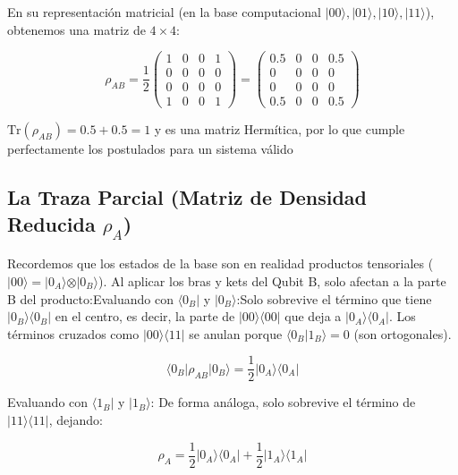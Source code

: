 \documentclass[11pt]{article}
\begin{document}
En su representación matricial (en la base computacional
\(\vert{}00\rangle, \vert{}01\rangle, \vert{}10\rangle, \vert{}11\rangle\)),
obtenemos una matriz de \(4 \times 4\):

\[\rho_{AB} = \frac{1}{2} \begin{pmatrix} 1 & 0 & 0 & 1 \\ 0 & 0 & 0 & 0 \\ 0 & 0 & 0 & 0 \\ 1 & 0 & 0 & 1 \end{pmatrix} = \begin{pmatrix} 0.5 & 0 & 0 & 0.5 \\ 0 & 0 & 0 & 0 \\ 0 & 0 & 0 & 0 \\ 0.5 & 0 & 0 & 0.5 \end{pmatrix}\]

\(\text{Tr}(\rho_{AB}) = 0.5 + 0.5 = 1\) y es una matriz Hermítica, por
lo que cumple perfectamente los postulados para un sistema válido

\subsection{\texorpdfstring{La Traza Parcial (Matriz de Densidad
Reducida
\(\rho_A\))}{La Traza Parcial (Matriz de Densidad Reducida \textbackslash rho\_A)}}\label{la-traza-parcial-matriz-de-densidad-reducida-rho_a}

Recordemos que los estados de la base son en realidad productos
tensoriales
(\(\vert{}00\rangle = \vert{}0_A\rangle \otimes \vert{}0_B\rangle\)). Al
aplicar los bras y kets del Qubit B, solo afectan a la parte B del
producto:Evaluando con \(\langle 0_B\vert{}\) y
\(\vert{} 0_B \rangle\):Solo sobrevive el término que tiene
\(\vert{}0_B\rangle\langle 0_B\vert{}\) en el centro, es decir, la parte
de \(\vert{}00\rangle\langle 00\vert{}\) que deja a
\(\vert{}0_A\rangle\langle 0_A\vert{}\). Los términos cruzados como
\(\vert{}00\rangle\langle 11\vert{}\) se anulan porque
\(\langle 0_B\vert{}1_B\rangle = 0\) (son ortogonales).

\[\langle 0_B \vert{} \rho_{AB} \vert{} 0_B \rangle = \frac{1}{2} \vert{}0_A\rangle\langle 0_A\vert{}\]

Evaluando con \(\langle 1_B\vert{}\) y \(\vert{} 1_B \rangle\): De forma
análoga, solo sobrevive el término de
\(\vert{}11\rangle\langle 11\vert{}\), dejando:

\[\rho_A = \frac{1}{2} \vert{}0_A\rangle\langle 0_A\vert{} + \frac{1}{2} \vert{}1_A\rangle\langle 1_A\vert{}\]
\end{document}
